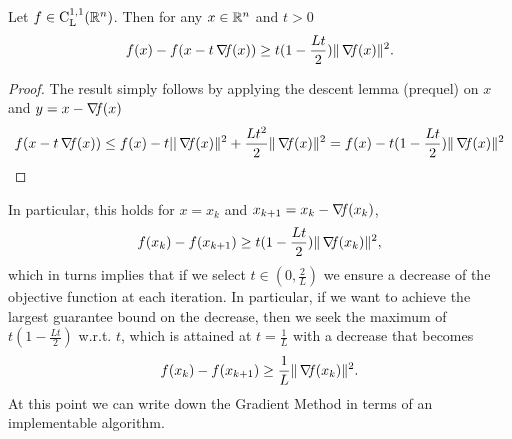 \documentclass[10pt,a4paper]{article}
\begin{document}
\begin{lemma} Let $f\in \mathord{\mathrm{C^{1,1}_{L}}}(\mathbb{R}^n)$. Then for any $x \in \mathbb{R}^n$ and $t>0$
	\begin{equation*}
		f(x) - f(x-t\operatorname*{\mathit{\nabla \!f}}(x)) \geq t (1-\frac{Lt}{2}) \| \operatorname*{\mathit{\nabla \!f}}(x)\|^2.
	\end{equation*}
\end{lemma}
\begin{proof}
	The result simply follows by applying the descent lemma (prequel) on $x$ and $y=x-\operatorname*{\mathit{\nabla \!f}}(x)$
	\begin{equation*}
		f(x-t\operatorname*{\mathit{\nabla \!f}}(x))\leq f(x) -t ||\operatorname*{\mathit{\nabla \!f}}(x)\|^2 + \frac{Lt^2}{2} \|\operatorname*{\mathit{\nabla \!f}}(x)\|^2 = f(x) - t (1-\frac{Lt}{2}) \| \operatorname*{\mathit{\nabla \!f}}(x)\|^2
	\end{equation*}
\end{proof}
\noindent In particular, this holds for $x=x_k$ and $x_{k+1} = x_k -\operatorname*{\mathit{\nabla \!f}}(x_k)$,
\begin{equation*}
	f(x_k) - f(x_{k+1}) \geq t (1-\frac{Lt}{2}) \| \operatorname*{\mathit{\nabla \!f}}(x_k)\|^2,
\end{equation*}
which in turns implies that if we select $t\in (0,\frac{2}{L})$ we ensure a decrease of the objective function at each iteration. In particular, if we want to achieve the largest guarantee bound on the decrease, then we seek the maximum of $t (1-\frac{Lt}{2})$ w.r.t. $t$, which is attained at $t=\frac{1}{L}$ with a decrease that becomes
\begin{equation}\label{eq:decrease}
	f(x_k) - f(x_{k+1}) \geq \frac{1}{L} \| \operatorname*{\mathit{\nabla \!f}}(x_k)\|^2.
\end{equation}
At this point we can write down the Gradient Method in terms of an implementable algorithm.
\end{document}
